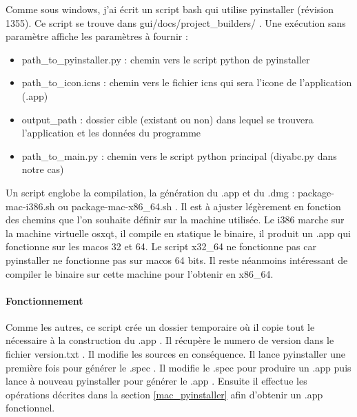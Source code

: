 \documentclass[12pt,a4paper]{article}
\begin{document}
        Comme sous windows, j'ai écrit un script bash qui utilise pyinstaller
        (révision 1355). Ce script se trouve dans
        gui/docs/project\_builders/ .  Une exécution sans
        paramètre affiche les paramètres à fournir : \\

        \begin{itemize}
            \item path\_to\_pyinstaller.py : chemin vers le script python de pyinstaller
            \item path\_to\_icon.icns : chemin vers le fichier icns qui sera l'icone de l'application (.app)
            \item output\_path : dossier cible (existant ou non) dans lequel se trouvera l'application et les données du programme
            \item path\_to\_main.py : chemin vers le script python principal (diyabc.py dans notre cas)\\
        \end{itemize}

        Un script englobe la compilation, la génération du .app et du .dmg : package-mac-i386.sh ou
        package-mac-x86\_64.sh . Il est à ajuster légèrement en fonction des chemins que l'on souhaite définir
        sur la machine utilisée. Le i386 marche sur la machine virtuelle osxqt, il compile en statique
        le binaire, il produit un .app qui fonctionne sur les macos 32 et 64. Le script x32\_64 ne fonctionne pas
        car pyinstaller ne fonctionne pas sur macos 64 bits. Il reste néanmoins intéressant de compiler le binaire
        sur cette machine pour l'obtenir en x86\_64.

        \paragraph{Fonctionnement}

        Comme les autres, ce script crée un dossier temporaire où il copie tout
        le nécessaire à la construction du .app .  Il récupère le numero de
        version dans le fichier version.txt . Il modifie les sources en
        conséquence. Il lance pyinstaller une première fois pour générer le
        .spec . Il modifie le .spec pour produire un .app puis lance à nouveau
        pyinstaller pour générer le .app .  Ensuite il effectue les opérations
        décrites dans la section \ref{mac_pyinstaller} afin d'obtenir un .app
        fonctionnel.\\
\end{document}
